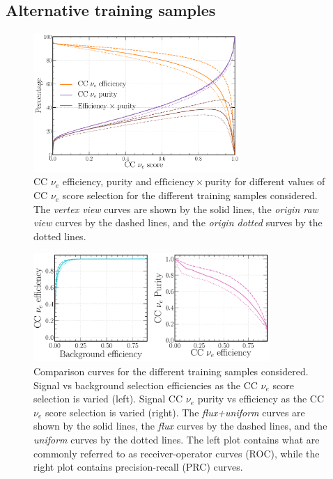 \subsection{Alternative training samples} %
\label{sec:results_alt_samples} %

\begin{figure} %
    \includegraphics[width=0.7\textwidth]{diagrams/7-results/sample_nuel_eff_curves.pdf}
    \caption[CC $\nu_{e}$ efficiency and purity curves for the different training samples]
    {CC $\nu_{e}$ efficiency, purity and $\mathrm{efficiency}\times\mathrm{purity}$ for different
        values of CC $\nu_{e}$ score selection for the different training samples considered. The
        \emph{vertex view} curves are shown by the solid lines, the \emph{origin raw view} curves
        by the dashed lines, and the \emph{origin dotted} surves by the dotted lines.}
    \label{fig:sample_nuel_eff_curves}
\end{figure}

\begin{figure} %
    \includegraphics[width=0.8\textwidth]{diagrams/7-results/sample_nuel_comp_curves.pdf}
    \caption[Comparison curves for the different training samples considered]
    {Comparison curves for the different training samples considered. Signal vs background
        selection efficiencies as the CC $\nu_{e}$ score selection is varied (left). Signal CC
        $\nu_{e}$ purity vs efficiency as the CC $\nu_{e}$ score selection is varied (right). The
        \emph{flux+uniform} curves are shown by the solid lines, the \emph{flux} curves by the
        dashed lines, and the \emph{uniform} curves by the dotted lines. The left plot contains
        what are commonly referred to as receiver-operator curves (ROC), while the right plot
        contains precision-recall (PRC) curves.}
    \label{fig:sample_nuel_comp_curves}
\end{figure}

